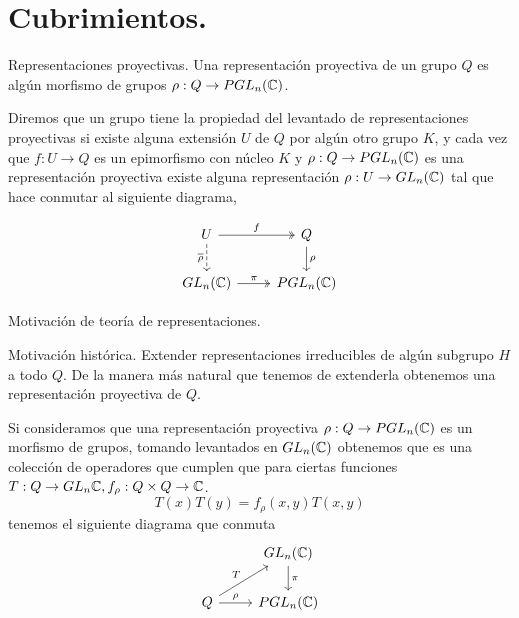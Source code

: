 \documentclass[aspectratio=169, 9pt]{beamer}
\begin{document}
\section[Cubrimientos.]{Cubrimientos.}
\begin{frame}[fragile]{Representaciones proyectivas.}
Una \alert{representación proyectiva} de un grupo $Q$ es algún morfismo de grupos $\rho:Q \to PGL_n(\Bbb C)$. \pause
\medskip


Diremos que un grupo tiene la \alert{propiedad del levantado de representaciones proyectivas} si existe alguna extensión $U$ de $Q$ por algún otro grupo $K$, y cada vez que $f:U \to Q$ es un epimorfismo con núcleo $K$ y $\rho:Q \to PGL_n(\Bbb C)$ es una representación proyectiva existe alguna representación $\rho:U \to GL_n(\Bbb C)$ tal que hace conmutar al siguiente diagrama,

\begin{equation*}
	\begin{tikzcd}
	U \arrow[r, "f", two heads] \arrow[d, "\overline \rho"', dashed] & Q \arrow[d, "\rho"] \\
	GL_n(\Bbb C) \arrow[r, "\pi", two heads]                         & PGL_n(\Bbb C)      
	\end{tikzcd}
\end{equation*}

\end{frame}
\begin{frame}[fragile]{Motivación de teoría de representaciones.}
\begin{exampleblock}{Motivación histórica.}
Extender representaciones irreducibles de algún subgrupo $H$ a todo $Q$. De la manera más natural que tenemos de extenderla obtenemos una representación proyectiva de $Q$.
\end{exampleblock}

\bigskip
\pause

Si consideramos que una representación proyectiva $\rho:Q \to PGL_n(\Bbb C)$ es un morfismo de grupos, tomando levantados en $GL_n(\Bbb C)$ obtenemos que es una colección de operadores que cumplen que para ciertas funciones $T:Q \to GL_n \Bbb C, f_\rho: Q \times Q \to \Bbb C$.
\begin{equation*}
	T(x)T(y) = f_\rho(x,y)T(x,y)
\end{equation*}
\pause tenemos el siguiente diagrama que conmuta
\begin{equation*}
	\begin{tikzcd}
	& GL_n(\Bbb C) \arrow[d, "\pi"] \\
	Q \arrow[ru, "T"] \arrow[r, "\rho"] & PGL_n(\Bbb C)                
	\end{tikzcd}
\end{equation*}
\end{frame}
\end{document}
